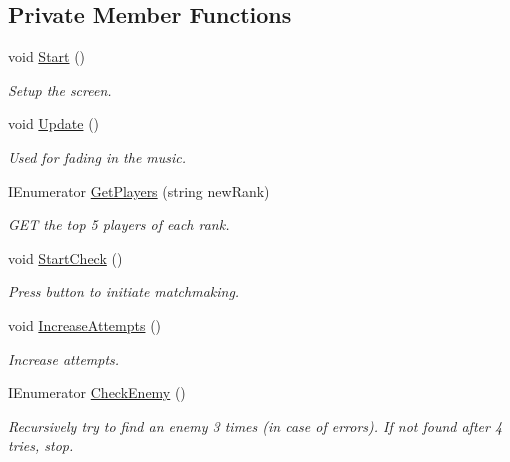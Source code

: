 \subsection*{Private Member Functions}
\begin{DoxyCompactItemize}
\item 
void \mbox{\hyperlink{class_ranked_match_screen_a98bbe7478a312eca3e6b43bf452f4923}{Start}} ()
\begin{DoxyCompactList}\small\item\em Setup the screen. \end{DoxyCompactList}\item 
void \mbox{\hyperlink{class_ranked_match_screen_ab11c2f202db041f75bf5efbd8063f2f2}{Update}} ()
\begin{DoxyCompactList}\small\item\em Used for fading in the music. \end{DoxyCompactList}\item 
I\+Enumerator \mbox{\hyperlink{class_ranked_match_screen_ac556e6c839f3ed858ee7120291bf84bd}{Get\+Players}} (string new\+Rank)
\begin{DoxyCompactList}\small\item\em G\+ET the top 5 players of each rank. \end{DoxyCompactList}\item 
void \mbox{\hyperlink{class_ranked_match_screen_af680a685d6adae7f7c9580a04eea4bed}{Start\+Check}} ()
\begin{DoxyCompactList}\small\item\em Press button to initiate matchmaking. \end{DoxyCompactList}\item 
void \mbox{\hyperlink{class_ranked_match_screen_a8c3dcce8a497dddd00881d64690be6df}{Increase\+Attempts}} ()
\begin{DoxyCompactList}\small\item\em Increase attempts. \end{DoxyCompactList}\item 
I\+Enumerator \mbox{\hyperlink{class_ranked_match_screen_ad61c0cdc08dd280707aa5e4bb29bdb58}{Check\+Enemy}} ()
\begin{DoxyCompactList}\small\item\em Recursively try to find an enemy 3 times (in case of errors). If not found after 4 tries, stop. \end{DoxyCompactList}\end{DoxyCompactItemize}

